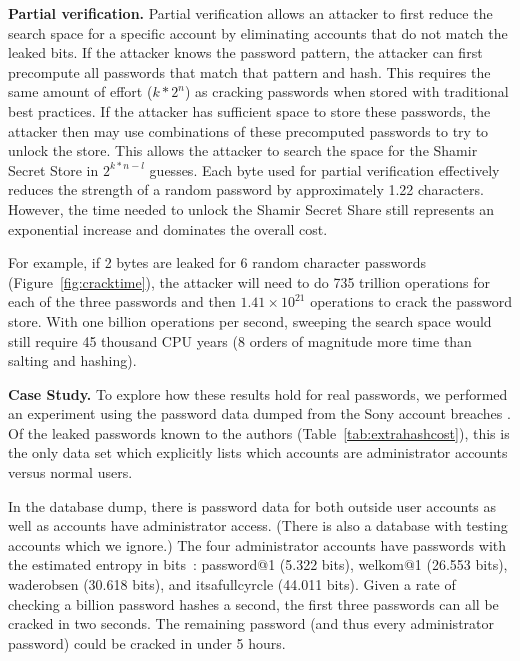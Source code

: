{\bf Partial verification.}
Partial verification allows an attacker to first reduce the search space for
a specific account by eliminating accounts that do not match the leaked bits.
If the attacker knows the password pattern, the attacker can first 
precompute all passwords that match that pattern and hash.   This requires
the same amount of effort ($k*2^n$) as cracking passwords when stored with 
traditional best practices.   If the attacker has sufficient space to
store these passwords, the attacker then may use combinations of
these precomputed passwords to try to unlock the store.  This allows
the attacker to search the space for the Shamir Secret Store in $2^{k*n-l}$ 
guesses. 
Each byte used for partial verification effectively
reduces the strength of a random password by approximately 1.22 characters.
However, the time needed to unlock the Shamir Secret Share still represents
an exponential increase and dominates the overall cost.

For example, if 2 bytes are leaked for 6 random character
passwords (Figure~\ref{fig:cracktime}), the attacker will need to do
735 trillion operations for each of the
three passwords and then $1.41 \times 10^{21}$ operations to crack the password
store.   With one billion operations per second, sweeping the search
space would still require 45 thousand CPU years (8 orders of magnitude
more time than salting and hashing).






{\bf Case Study.}
To explore how these results hold for real passwords, we performed an
experiment using the password data dumped from the Sony account breaches
\cite{sonyhack}.   Of the leaked passwords known to the authors
(Table~\ref{tab:extrahashcost}), this is the only data set which 
explicitly lists which accounts are administrator accounts versus normal users.

In the database dump, there is password data for both outside
user accounts as well as accounts have administrator access.   (There is
also a database with testing accounts which we ignore.)
The four administrator accounts have passwords with the estimated
entropy in bits~\cite{passwordstrength}:
password@1 (5.322 bits), %
welkom@1 (26.553 bits),
waderobsen (30.618 bits), %
and itsafullcyrcle (44.011 bits).   
Given a rate of checking a billion password hashes a second, the first 
three passwords can all be cracked in two seconds.   The
remaining password (and thus every administrator password) could be
cracked in under 5 hours.

